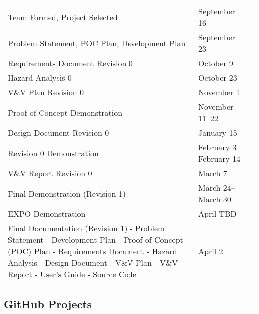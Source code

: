 \documentclass{article}
\begin{document}
\noindent \begin{tabular}{ p{9 cm} l r}

  Team Formed, Project Selected & September 16 \\

  Problem Statement, POC Plan, Development Plan & September 23  \\

  Requirements Document Revision 0 & October 9  \\

  Hazard Analysis 0 & October 23 \\

  V\&V Plan Revision 0 & November 1  \\

  Proof of Concept Demonstration & November 11--22  \\

  Design Document Revision 0 & January 15  \\

  Revision 0 Demonstration & February 3--February 14 \\

  V\&V Report Revision 0 & March 7  \\

  Final Demonstration (Revision 1) & March 24--March 30 \\

  EXPO Demonstration & April TBD \\

  Final Documentation (Revision 1)\newline 
   - Problem Statement\newline
   - Development Plan\newline
   - Proof of Concept (POC) Plan\newline
   - Requirements Document\newline
   - Hazard Analysis\newline
   - Design Document\newline
   - V\&V Plan\newline
   - V\&V Report\newline
   - User's Guide\newline
   - Source Code\newline &  April 2 \\
 
\end{tabular}

\subsection{GitHub Projects}
\end{document}
